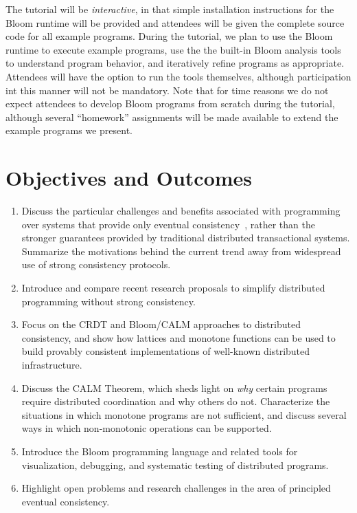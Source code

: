 \documentclass{sig-alternate}
\begin{document}
The tutorial will be \emph{interactive}, in that simple installation
instructions for the Bloom runtime will be provided and attendees will be given
the complete source code for all example programs. During the tutorial, we plan
to use the Bloom runtime to execute example programs, use the the built-in Bloom
analysis tools to understand program behavior, and iteratively refine programs
as appropriate. Attendees will have the option to run the tools themselves,
although participation int this manner will not be mandatory. Note that for time
reasons we do not expect attendees to develop Bloom programs from scratch during
the tutorial, although several ``homework'' assignments will be made available to
extend the example programs we present.

\section{Objectives and Outcomes}

\begin{enumerate}
\item
  Discuss the particular challenges and benefits associated with programming
  over systems that provide only eventual
  consistency~\cite{DeCandia2007,Terry1995,vogels}, rather than the stronger
  guarantees provided by traditional distributed transactional systems.
  Summarize the motivations behind the current trend away from widespread use of
  strong consistency protocols.
\item
  Introduce and compare recent research proposals to simplify distributed
  programming without strong consistency.
\item
  Focus on the CRDT and Bloom/CALM approaches to distributed
  consistency, and show how lattices and monotone functions can be used to build
  provably consistent implementations of well-known distributed infrastructure.
\item
  Discuss the CALM Theorem, which sheds light on \emph{why} certain programs
  require distributed coordination and why others do not.  Characterize the
  situations in which monotone programs are not sufficient, and discuss several
  ways in which non-monotonic operations can be supported.
\item
  Introduce the Bloom programming language and related tools for visualization,
  debugging, and systematic testing of distributed programs.
\item
  Highlight open problems and research challenges in the area of principled
  eventual consistency.
\end{enumerate}
\end{document}
